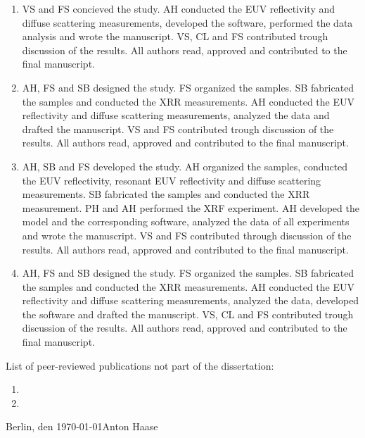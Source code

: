 \begin{enumerate}[label=\arabic*) ]
    \item {} 
	
	VS and FS concieved the study. AH conducted the EUV reflectivity and diffuse scattering measurements, developed the software, performed the data analysis and wrote the manuscript. VS, CL and FS contributed trough discussion of the results.
	All authors read, approved and contributed to the final manuscript.

    \item {} 
    
	AH, FS and SB designed the study. FS organized the samples. SB fabricated the samples and conducted the XRR measurements. AH conducted the EUV reflectivity and diffuse scattering measurements, analyzed the data and drafted the manuscript. VS and FS contributed trough discussion of the results. All authors read, approved and contributed to the final manuscript.

    \item {} 
    
	AH, SB and FS developed the study. AH organized the samples, conducted the EUV reflectivity, resonant EUV reflectivity and diffuse scattering measurements. SB fabricated the samples and conducted the XRR measurement. PH and AH performed the XRF experiment. AH developed the model and the corresponding software, analyzed the data of all experiments and wrote the manuscript. VS and FS contributed through discussion of the results. All authors read, approved and contributed to the final manuscript.

    \item {} 
    
	AH, FS and SB designed the study. FS organized the samples. SB fabricated the samples and conducted the XRR measurements. AH conducted the EUV reflectivity and diffuse scattering measurements, analyzed the data, developed the software and drafted the manuscript. VS, CL and FS contributed trough discussion of the results. All authors read, approved and contributed to the final manuscript.

\end{enumerate}
List of peer-reviewed publications not part of the dissertation:
\begin{enumerate}[label=\arabic*) ]
    \item {} 

    \item {} 
    
\end{enumerate}

\vspace{3cm}

\noindent Berlin, den \today \hfill Anton Haase

\cleardoublepage
